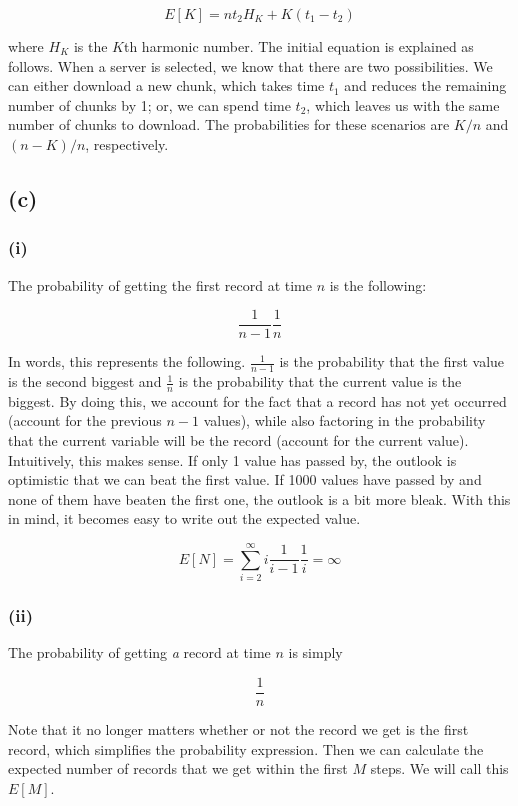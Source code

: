 \documentclass{article}
\begin{document}
\[ E[K] = n t_2 H_K + K(t_1 - t_2) \]

\noindent where $H_K$ is the $K$th harmonic number. The initial equation is explained
as follows. When a server is selected, we know that there are two possibilities.
We can either download a new chunk, which takes time $t_1$ and reduces the remaining
number of chunks by 1; or, we can spend time $t_2$, which leaves us with the same
number of chunks to download. The probabilities for these scenarios are $K / n$
and $(n - K) / n$, respectively.

\subsection*{(c)}
\subsubsection*{(i)}
The probability of getting the first record at time $n$ is the following:

\[ \frac{1}{n - 1} \frac{1}{n} \]

\noindent In words, this represents the following. $\frac{1}{n - 1}$ is the 
probability that the first value is the second biggest and $\frac{1}{n}$ is the 
probability that the current value is the biggest. By doing this, we account
for the fact that a record has not yet occurred (account for the previous $n - 1$
values), while also factoring in the probability that the current variable will 
be the record (account for the current value). Intuitively, this makes
sense. If only 1 value has passed by, the outlook is optimistic that we can beat
the first value. If 1000 values have passed by and none of them have beaten the 
first one, the outlook is a bit more bleak. With this in mind, it becomes easy
to write out the expected value.

\[ E[N] = \sum_{i = 2}^{\infty} i \frac{1}{i - 1} \frac{1}{i} = \infty \]

\subsubsection*{(ii)}
The probability of getting \textit{a} record at time $n$ is simply

\[ \frac{1}{n} \]

\noindent Note that it no longer matters whether or not the record we get is the 
first record, which simplifies the probability expression. Then we can calculate the 
expected number of records that we get within the first $M$ steps. We will call this 
$E[M]$.
\end{document}
